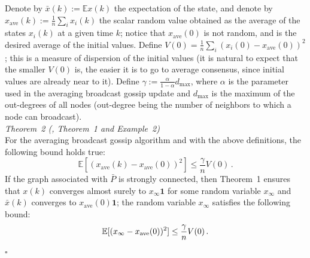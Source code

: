 \documentclass[oneside]{article}
\begin{document}
	 Denote by $\bar x(k) :=  \mathbb E x(k)$ the expectation of the state, and denote by $x_{\text{ave}}(k) := \frac{1}{n}\sum_i x_i(k)$ the scalar random value obtained as the average of the states $x_i(k)$ at a given time $k$; notice that $x_{\text{ave}}(0)$ is not random, and is the desired average of the initial values.
	 Define $V(0) = \frac{1}{n} \sum_i (x_i(0) - x_{\text{ave}}(0))^2 $; this is a measure of dispersion of the initial values (it is natural to expect that the smaller $V(0)$ is, the easier it is to go to average consensus, since initial values are already near to it). Define $\gamma:= \frac{\alpha}{1-\alpha} d_{\max}$,
	 where $\alpha$ is the parameter used in the averaging broadcast gossip update and $d_{\max}$ is the maximum of the out-degrees of all nodes (out-degree being the number of neighbors to which a node can broadcast).\\

	\textit{Theorem~2 (\cite{gossip-small-error}, Theorem~1 and Example~2)}\\
For the averaging broadcast gossip algorithm and with the above definitions, the following bound holds true:
\[ \mathbb E [ (x_{\text{ave}}(k) - x_{\text{ave}}(0))^2 ] \le
 \frac{\gamma}{n} V(0)  \, .\]
If the graph associated with $\bar P$ is strongly connected, then Theorem~1 ensures that
$x(k)$ converges almost surely to $x_{\infty} \mathbf 1$ for some random variable $x_{\infty}$ and $\bar x(k)$ converges to $x_{\text{ave}}(0) \mathbf 1$;  the random variable $x_{\infty}$ satisfies the following bound:
\[ \mathbb E [ (x_{\infty} - x_{\text{ave}}(0))^2 ] \le
\frac{\gamma}{n} V(0)\,. \vspace{-5mm}\]
\hfill $\square$
%
%
\end{document}
